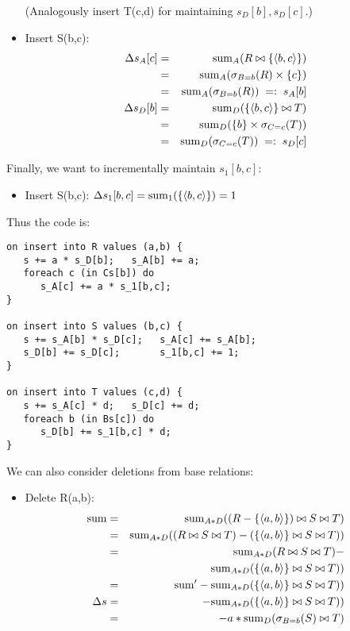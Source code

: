 \begin{example}
\begin{itemize}
(Analogously insert T(c,d) for maintaining $s_{D}[b], s_{D}[c]$.)

\item
Insert S(b,c):
\begin{eqnarray*}
\Delta s_A[c] &=&
\mathrm{sum}_{A}(R \bowtie \{{\langle b,c\rangle}\})
\\ &=&
\mathrm{sum}_{A}(\sigma_{B=b}(R) \times \{c\})
\\ &=&
\mathrm{sum}_{A}(\sigma_{B=b}(R))
\;=:\; s_A[b]
\\
\Delta s_D[b] &=&
\mathrm{sum}_{D}(\{{\langle b,c\rangle}\} \bowtie T)
\\ &=&
\mathrm{sum}_{D}(\{b\} \times \sigma_{C=c}(T))
\\ &=&
\mathrm{sum}_{D}(\sigma_{C=c}(T))
\;=:\; s_D[c]
\end{eqnarray*}
\end{itemize}

Finally, we want to incrementally maintain $s_1[b,c]$:
\begin{itemize}
\item
Insert S(b,c):
$
\Delta s_1[b,c] =
\mathrm{sum}_{1}(\{{\langle b,c\rangle}\}) = 1
$
\end{itemize}

Thus the code is:
\begin{verbatim}
on insert into R values (a,b) {
   s += a * s_D[b];   s_A[b] += a;
   foreach c (in Cs[b]) do
      s_A[c] += a * s_1[b,c];
}

on insert into S values (b,c) {
   s += s_A[b] * s_D[c];   s_A[c] += s_A[b];
   s_D[b] += s_D[c];       s_1[b,c] += 1;
}

on insert into T values (c,d) {
   s += s_A[c] * d;   s_D[c] += d;
   foreach b (in Bs[c]) do
      s_D[b] += s_1[b,c] * d;
}
\end{verbatim}

We can also consider deletions from base relations:
\begin{itemize}
\item
Delete R(a,b):
\begin{eqnarray*}
\mathrm{sum} &=& \mathrm{sum}_{A*D}((R-\{{\langle a,b\rangle}\}) \bowtie S \bowtie T)\\
&=& \mathrm{sum}_{A*D}((R \bowtie S \bowtie T) -
(\{{\langle a,b\rangle}\} \bowtie S \bowtie T))\\
&=& \mathrm{sum}_{A*D}(R \bowtie S \bowtie T) -\\
& & \mathrm{sum}_{A*D}(\{{\langle a,b\rangle}\} \bowtie S \bowtie T))\\
&=& \mathrm{sum}' - \mathrm{sum}_{A*D}(\{{\langle a,b\rangle}\} \bowtie S \bowtie T))\\
\Delta s &=&  - \mathrm{sum}_{A*D}(\{{\langle a,b\rangle}\} \bowtie S \bowtie T))\\
&=& -a*\mathrm{sum}_{D}(\sigma_{B=b}(S) \bowtie T)
\end{eqnarray*} 
\end{itemize}


\end{example}

